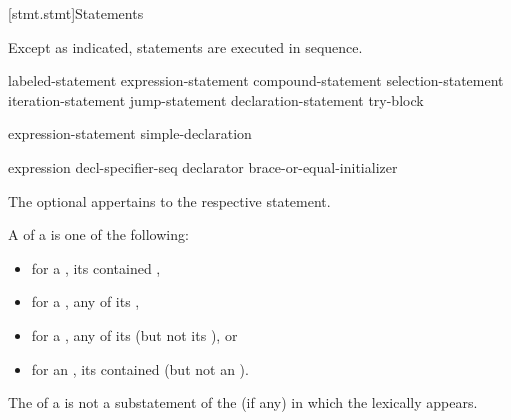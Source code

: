 [stmt.stmt]{Statements}%



\pnum
Except as indicated, statements are executed in sequence.

\begin{bnf}
\br
    labeled-statement\br
     expression-statement\br
     compound-statement\br
     selection-statement\br
     iteration-statement\br
     jump-statement\br
    declaration-statement\br
     try-block

\br
    expression-statement\br
    simple-declaration

\br
    expression\br
     decl-specifier-seq declarator brace-or-equal-initializer
\end{bnf}

The optional  appertains to the respective statement.

\pnum
A  of a  is one of the following:
\begin{itemize}
\item
  for a , its contained ,
\item
  for a , any  of its ,
\item
  for a , any of its  (but not its ), or
\item
  for an , its contained  (but not an ).
\end{itemize}
\begin{note}
The  of a 
is not a substatement of the  (if any)
in which the  lexically appears.
\end{note}

